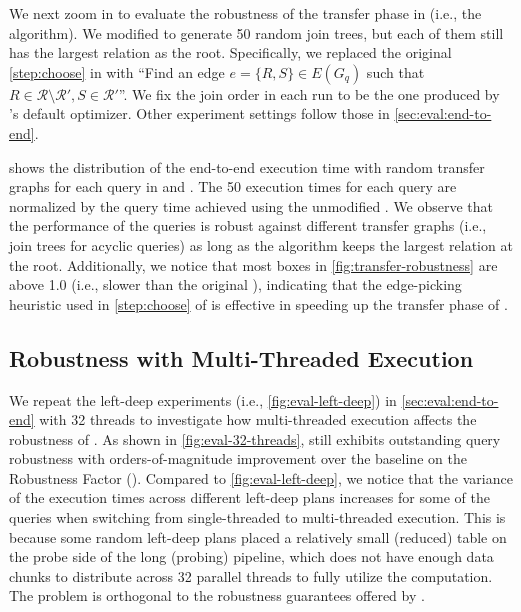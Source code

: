 We next zoom in to evaluate the robustness of the transfer phase in \rpt (i.e., the \TreeStruct algorithm). We modified \TreeStruct to generate 50 random join trees, but each of them still has the largest relation as the root. Specifically, we replaced the original \cref{step:choose} in \TreeStruct with ``Find an edge $e = \{R,S\} \in E(G_q)$ such that $R\in\mathcal R\setminus \mathcal R',S\in\mathcal R'$''. We fix the join order in each run to be the one produced by \duckdb's default optimizer. Other experiment settings follow those in \cref{sec:eval:end-to-end}.

 shows the distribution of the end-to-end execution time with random \TreeStruct transfer graphs for each query in \tpch and \job. The 50 execution times for each query are normalized by the query time achieved using the unmodified \TreeStruct. We observe that the performance of the queries is robust against different transfer graphs (i.e., join trees for acyclic queries) as long as the algorithm keeps the largest relation at the root. Additionally, we notice that most boxes in \cref{fig:transfer-robustness} are above 1.0 (i.e., slower than the original \TreeStruct), indicating that the edge-picking heuristic used in \cref{step:choose} of \TreeStruct is effective in speeding up the transfer phase of \rpt.

\subsection{Robustness with Multi-Threaded Execution}
\label{sec:eval:multi-thread}

We repeat the left-deep experiments (i.e., \cref{fig:eval-left-deep}) in \cref{sec:eval:end-to-end} with 32 threads to investigate how multi-threaded execution affects the robustness of \rpt. As shown in \cref{fig:eval-32-threads}, \rpt still exhibits outstanding query robustness with orders-of-magnitude improvement over the baseline on the Robustness Factor (\robustmetric). Compared to \cref{fig:eval-left-deep}, we notice that the variance of the execution times across different left-deep plans increases for some of the queries when switching from single-threaded to multi-threaded execution. This is because some random left-deep plans placed a relatively small (reduced) table on the probe side of the long (probing) pipeline, which does not have enough data chunks to distribute across 32 parallel threads to fully utilize the computation. The problem is orthogonal to the robustness guarantees offered by \rpt.

